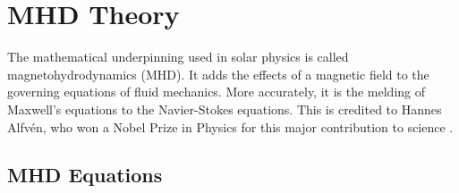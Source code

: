 \section{MHD Theory}

    The mathematical underpinning used in solar physics is called magnetohydrodynamics (MHD).
    It adds the effects of a magnetic field to the governing equations of fluid mechanics. 
    More accurately, it is the melding of Maxwell's equations to the Navier-Stokes equations.
    This is credited to Hannes Alfv\'en, who won a Nobel Prize in Physics for this major contribution to science \citep{1942Natur.150..405A,erdelyi2007}.

\subsection{MHD Equations}


